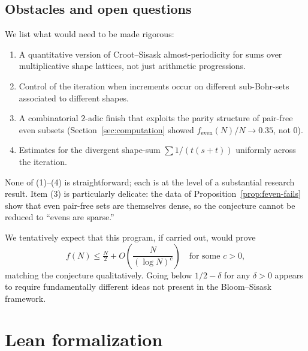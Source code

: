 \documentclass[11pt]{amsart}
\theoremstyle{plain}
\theoremstyle{definition}
\begin{document}
\subsection{Obstacles and open questions}

We list what would need to be made rigorous:

\begin{enumerate}[label=(\arabic*)]
  \item A quantitative version of Croot--Sisask almost-periodicity for sums over multiplicative shape lattices, not just arithmetic progressions.
  \item Control of the iteration when increments occur on different sub-Bohr-sets associated to different shapes.
  \item A combinatorial $2$-adic finish that exploits the parity structure of pair-free even subsets (Section~\ref{sec:computation} showed $f_{\text{even}}(N)/N \to 0.35$, not $0$).
  \item Estimates for the divergent shape-sum $\sum 1/(t(s+t))$ uniformly across the iteration.
\end{enumerate}

None of (1)--(4) is straightforward; each is at the level of a substantial research result. Item (3) is particularly delicate: the data of Proposition~\ref{prop:feven-fails} show that even pair-free sets are themselves dense, so the conjecture cannot be reduced to ``evens are sparse.''

We tentatively expect that this program, if carried out, would prove
\[
  f(N) \leq \tfrac{N}{2} + O\left(\frac{N}{(\log N)^{c}}\right) \quad \text{for some } c > 0,
\]
matching the conjecture qualitatively. Going below $1/2 - \delta$ for any $\delta > 0$ appears to require fundamentally different ideas not present in the Bloom--Sisask framework.

\section{Lean formalization}\label{sec:lean}
\end{document}
